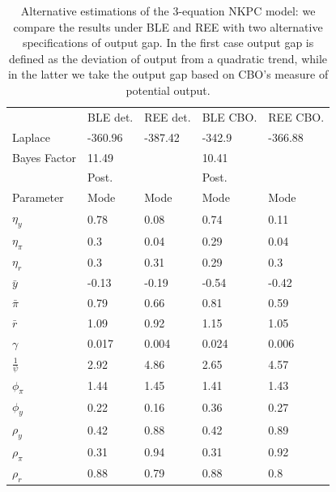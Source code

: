\begin{table}[!htbp]
\centering


\begin{tabular}{l||ll||ll}
 &     BLE det. &   REE det.   & BLE CBO.   & REE CBO.\\
 Laplace&      -360.96   & -387.42   & -342.9  & -366.88 \\
 \hline
 Bayes Factor &       11.49   &    & 10.41  &  \\
\hline
\hline
&        Post.  &  & Post. & \\
\hline
 Parameter & Mode &   Mode & Mode & Mode\\
$\eta_y$   &      0.78 &   0.08 &   0.74   & 0.11\\
$\eta_{\pi}$ &  0.3 &   0.04 &   0.29 &   0.04 \\
$\eta_r$ &     0.3   & 0.31   & 0.29   & 0.3 \\
$\bar{y}$  &     -0.13 &   -0.19   & -0.54 &   -0.42\\
$\bar{\pi}$    &  0.79 &   0.66 &   0.81 &   0.59 \\
$\bar{r}$ &      1.09 &   0.92 &   1.15 &   1.05 \\
$\gamma$  &     0.017 &  0.004 &   0.024 &   0.006\\
$\frac{1}{\psi}$  &       2.92 &   4.86   & 2.65 &   4.57 \\
$\phi_{\pi}$  & 1.44 &   1.45 &   1.41 &   1.43 \\
$\phi_y$  &     0.22 &   0.16 &   0.36 &   0.27 \\
$\rho_y$ &      0.42 &   0.88 &   0.42 &   0.89 \\
$\rho_{\pi}$  &  0.31 &   0.94 &   0.31 &   0.92 \\
$\rho_r$ &      0.88 &   0.79 &   0.88 &   0.8 
\end{tabular}
\caption{Alternative estimations of the 3-equation NKPC model: we compare the results under BLE and REE with two alternative specifications of output gap. In the first case output gap is defined as the deviation of output from a quadratic trend, while in the latter we take the output gap based on CBO's measure of potential output.  }
\label{nkm_alt_gap}
\end{table}

